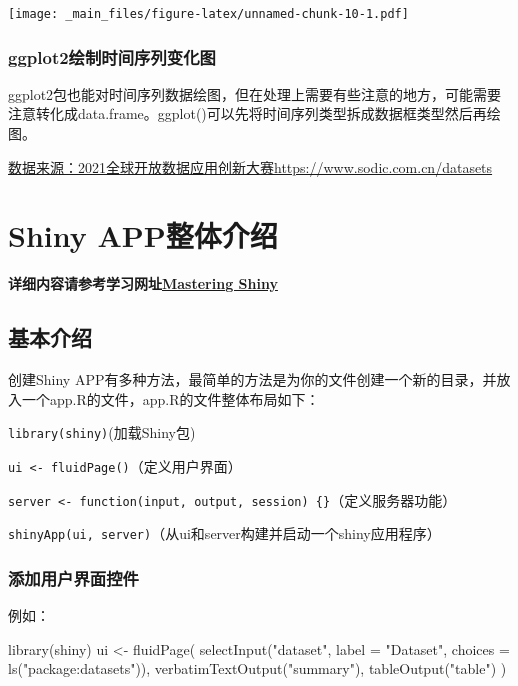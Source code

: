 \documentclass[
]{book}
\newenvironment{Shaded}{\begin{snugshade}}{\end{snugshade}}
\newcommand{\AttributeTok}[1]{\textcolor[rgb]{0.77,0.63,0.00}{#1}}
\newcommand{\FunctionTok}[1]{\textcolor[rgb]{0.00,0.00,0.00}{#1}}
\newcommand{\NormalTok}[1]{#1}
\newcommand{\OtherTok}[1]{\textcolor[rgb]{0.56,0.35,0.01}{#1}}
\newcommand{\StringTok}[1]{\textcolor[rgb]{0.31,0.60,0.02}{#1}}
\begin{document}
\texttt{[image: \_main\_files/figure-latex/unnamed-chunk-10-1.pdf]}

\hypertarget{ggplot2ux7ed8ux5236ux65f6ux95f4ux5e8fux5217ux53d8ux5316ux56fe}{%
\subsection{ggplot2绘制时间序列变化图}\label{ggplot2ux7ed8ux5236ux65f6ux95f4ux5e8fux5217ux53d8ux5316ux56fe}}

ggplot2包也能对时间序列数据绘图，但在处理上需要有些注意的地方，可能需要注意转化成data.frame。ggplot()可以先将时间序列类型拆成数据框类型然后再绘图。

\href{https://www.sodic.com.cn/datasets}{数据来源：2021全球开放数据应用创新大赛https://www.sodic.com.cn/datasets}

\hypertarget{shiny-appux6574ux4f53ux4ecbux7ecd}{%
\chapter{Shiny APP整体介绍}\label{shiny-appux6574ux4f53ux4ecbux7ecd}}

\textbf{详细内容请参考学习网址\href{https://mastering-shiny.org}{Mastering Shiny} }

\hypertarget{ux57faux672cux4ecbux7ecd}{%
\section{基本介绍}\label{ux57faux672cux4ecbux7ecd}}

创建Shiny APP有多种方法，最简单的方法是为你的文件创建一个新的目录，并放入一个app.R的文件，app.R的文件整体布局如下：

\texttt{library(shiny)}(加载Shiny包)

\texttt{ui\ \textless{}-\ fluidPage()}（定义用户界面）

\texttt{server\ \textless{}-\ function(input,\ output,\ session)\ \{\}}（定义服务器功能）

\texttt{shinyApp(ui,\ server)}（从ui和server构建并启动一个shiny应用程序）

\hypertarget{ux6dfbux52a0ux7528ux6237ux754cux9762ux63a7ux4ef6}{%
\subsection{添加用户界面控件}\label{ux6dfbux52a0ux7528ux6237ux754cux9762ux63a7ux4ef6}}

例如：

\begin{Shaded}
\begin{Highlighting}[]
\FunctionTok{library}\NormalTok{(shiny)}
\NormalTok{ui }\OtherTok{\textless{}{-}} \FunctionTok{fluidPage}\NormalTok{(}
  \FunctionTok{selectInput}\NormalTok{(}\StringTok{"dataset"}\NormalTok{, }\AttributeTok{label =} \StringTok{"Dataset"}\NormalTok{, }\AttributeTok{choices =} \FunctionTok{ls}\NormalTok{(}\StringTok{"package:datasets"}\NormalTok{)),}
  \FunctionTok{verbatimTextOutput}\NormalTok{(}\StringTok{"summary"}\NormalTok{),}
  \FunctionTok{tableOutput}\NormalTok{(}\StringTok{"table"}\NormalTok{)}
\NormalTok{)}
\end{Highlighting}
\end{Shaded}
\end{document}
